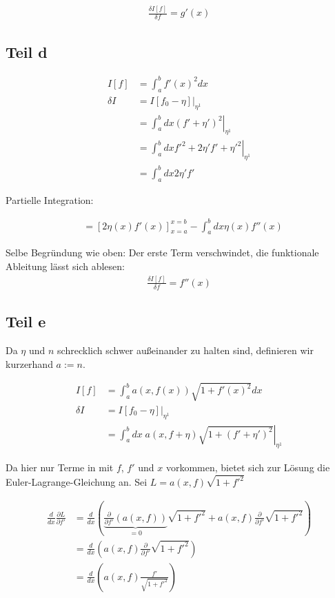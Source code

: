 \documentclass[a4paper,german,12pt,smallheadings]{scrartcl}
\begin{document}
\begin{align*}
  \frac{\delta I[f]}{\delta f} = g'(x)
\end{align*}

\subsection*{Teil d}
\begin{align*}
  I[f] &= \int_a^b f'(x)^2 dx \\
  \delta I &= \left.I[f_0 - \eta]\right|_{\eta^1} \\
  &=\left.\int_a^b dx (f' + \eta')^2 \right|_{\eta^1} \\
  &=\left.\int_a^b dx f'^2 + 2\eta'f' + \eta'^2 \right|_{\eta^1} \\
  &=\int_a^b dx 2\eta'f'
\end{align*}

Partielle Integration:

\begin{align*}
  &=\left[2\eta(x) f'(x)\right]_{x=a}^{x=b} - \int_a^b dx \eta(x) f''(x)
\end{align*}

Selbe Begründung wie oben: Der erste Term verschwindet, die funktionale Ableitung lässt sich ablesen:
\begin{align*}
  \frac{\delta I[f]}{\delta f} = f''(x)
\end{align*}

\subsection*{Teil e}
Da $\eta$ und $n$ schrecklich schwer außeinander zu halten sind,
definieren wir kurzerhand $a := n$.

\begin{align*}
  I[f] &= \int_a^b a(x,f(x)) \sqrt{1+f'(x)^2} dx \\
  \delta I &= \left.I[f_0 - \eta]\right|_{\eta^1} \\
  &=\left.\int_a^b dx \; a(x, f + \eta) \sqrt{1+(f'+\eta')^2} \right|_{\eta^1}
\end{align*}

Da hier nur Terme in mit $f$, $f'$ und $x$ vorkommen, bietet sich zur Lösung
die Euler-Lagrange-Gleichung an. Sei $L = a(x, f) \sqrt{1+f'^2}$

\begin{align*}
  \frac{d}{dx} \frac{\partial L}{\partial f'} &= \frac{d}{dx} \left(\underbrace{\frac{\partial}{\partial f'} (a(x, f))}_{=0} \sqrt{1+f'^2} + a(x,f) \frac{\partial}{\partial f'} \sqrt{1+f'^2} \right) \\
  &= \frac{d}{dx} \left(a(x,f) \frac{\partial}{\partial f'} \sqrt{1+f'^2} \right) \\
  &= \frac{d}{dx} \left(a(x,f) \frac{f'}{\sqrt{1+f'^2}} \right)
\end{align*}
\end{document}
